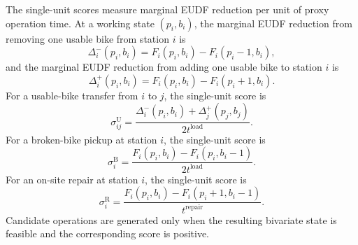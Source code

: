 The single-unit scores measure marginal EUDF reduction per unit of proxy
operation time. At a working state $(p_i,b_i)$, the marginal EUDF reduction from
removing one usable bike from station $i$ is
\begin{equation}
\Delta_i^{-}(p_i,b_i)=F_i(p_i,b_i)-F_i(p_i-1,b_i),
\label{ch5:eq:eats-remove-usable-marginal}
\end{equation}
and the marginal EUDF reduction from adding one usable bike to station $i$ is
\begin{equation}
\Delta_i^{+}(p_i,b_i)=F_i(p_i,b_i)-F_i(p_i+1,b_i).
\label{ch5:eq:eats-add-usable-marginal}
\end{equation}
For a usable-bike transfer from $i$ to $j$, the single-unit score is
\begin{equation}
\sigma_{ij}^{\mathrm U}
=\frac{\Delta_i^{-}(p_i,b_i)+\Delta_j^{+}(p_j,b_j)}
{2t^{\mathrm{load}}}.
\label{ch5:eq:eats-usable-score}
\end{equation}
For a broken-bike pickup at station $i$, the single-unit score is
\begin{equation}
\sigma_i^{\mathrm B}
=\frac{F_i(p_i,b_i)-F_i(p_i,b_i-1)}{2t^{\mathrm{load}}}.
\label{ch5:eq:eats-broken-pickup-score}
\end{equation}
For an on-site repair at station $i$, the single-unit score is
\begin{equation}
\sigma_i^{\mathrm R}
=\frac{F_i(p_i,b_i)-F_i(p_i+1,b_i-1)}{t^{\mathrm{repair}}}.
\label{ch5:eq:eats-repair-score}
\end{equation}
Candidate operations are generated only when the resulting bivariate state is
feasible and the corresponding score is positive.

